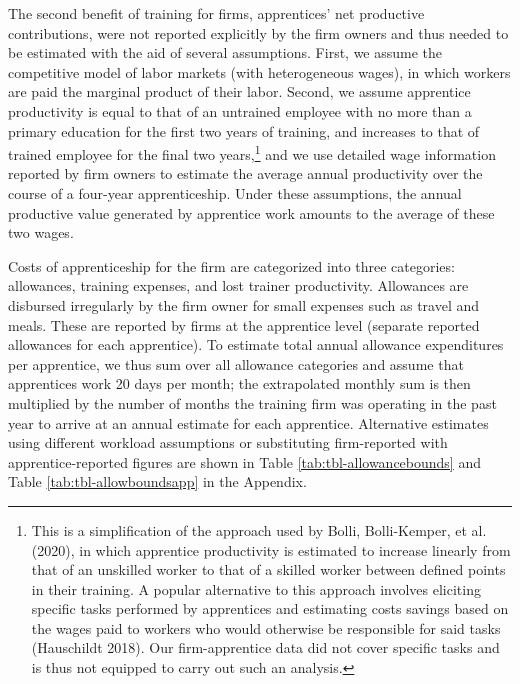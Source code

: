 \documentclass[
  a4paper, twoside, 12pt]{book}
\begin{document}
The second benefit of training for firms, apprentices' net productive contributions, were not reported explicitly by the firm owners and thus needed to be estimated with the aid of several assumptions. First, we assume the competitive model of labor markets (with heterogeneous wages), in which workers are paid the marginal product of their labor. Second, we assume apprentice productivity is equal to that of an untrained employee with no more than a primary education for the first two years of training, and increases to that of trained employee for the final two years,\footnote{This is a simplification of the approach used by Bolli, Bolli-Kemper, et al. (2020), in which apprentice productivity is estimated to increase linearly from that of an unskilled worker to that of a skilled worker between defined points in their training. A popular alternative to this approach involves eliciting specific tasks performed by apprentices and estimating costs savings based on the wages paid to workers who would otherwise be responsible for said tasks (Hauschildt 2018). Our firm-apprentice data did not cover specific tasks and is thus not equipped to carry out such an analysis.} and we use detailed wage information reported by firm owners to estimate the average annual productivity over the course of a four-year apprenticeship. Under these assumptions, the annual productive value generated by apprentice work amounts to the average of these two wages.

Costs of apprenticeship for the firm are categorized into three categories: allowances, training expenses, and lost trainer productivity. Allowances are disbursed irregularly by the firm owner for small expenses such as travel and meals. These are reported by firms at the apprentice level (separate reported allowances for each apprentice). To estimate total annual allowance expenditures per apprentice, we thus sum over all allowance categories and assume that apprentices work 20 days per month; the extrapolated monthly sum is then multiplied by the number of months the training firm was operating in the past year to arrive at an annual estimate for each apprentice. Alternative estimates using different workload assumptions or substituting firm-reported with apprentice-reported figures are shown in Table \ref{tab:tbl-allowancebounds} and Table \ref{tab:tbl-allowboundsapp} in the Appendix.
\end{document}
